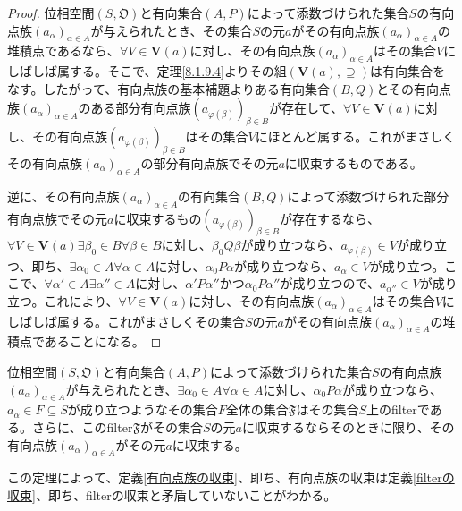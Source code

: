 \documentclass[dvipdfmx]{jsarticle}
\begin{document}
\begin{proof}
位相空間$\left( S,\mathfrak{O} \right)$と有向集合$(A,P)$によって添数づけられた集合$S$の有向点族$\left( a_{\alpha} \right)_{\alpha \in A}$が与えられたとき、その集合$S$の元$a$がその有向点族$\left( a_{\alpha} \right)_{\alpha \in A}$の堆積点であるなら、$\forall V \in \mathbf{V}(a)$に対し、その有向点族$\left( a_{\alpha} \right)_{\alpha \in A}$はその集合$V$にしばしば属する。そこで、定理\ref{8.1.9.4}よりその組$\left( \mathbf{V}(a), \supseteq \right)$は有向集合をなす。したがって、有向点族の基本補題よりある有向集合$(B,Q)$とその有向点族$\left( a_{\alpha} \right)_{\alpha \in A}$のある部分有向点族$\left( a_{\varphi(\beta)} \right)_{\beta \in B}$が存在して、$\forall V \in \mathbf{V}(a)$に対し、その有向点族$\left( a_{\varphi(\beta)} \right)_{\beta \in B}$はその集合$V$にほとんど属する。これがまさしくその有向点族$\left( a_{\alpha} \right)_{\alpha \in A}$の部分有向点族でその元$a$に収束するものである。\par
逆に、その有向点族$\left( a_{\alpha} \right)_{\alpha \in A}$の有向集合$(B,Q)$によって添数づけられた部分有向点族でその元$a$に収束するもの$\left( a_{\varphi(\beta)} \right)_{\beta \in B}$が存在するなら、$\forall V \in \mathbf{V}(a)\exists\beta_{0} \in B\forall\beta \in B$に対し、$\beta_{0}Q\beta$が成り立つなら、$a_{\varphi(\beta)} \in V$が成り立つ、即ち、$\exists\alpha_{0} \in A\forall\alpha \in A$に対し、$\alpha_{0}P\alpha$が成り立つなら、$a_{\alpha} \in V$が成り立つ。ここで、$\forall\alpha' \in A\exists\alpha'' \in A$に対し、$\alpha'P\alpha''$かつ$\alpha_{0}P\alpha''$が成り立つので、$a_{\alpha''} \in V$が成り立つ。これにより、$\forall V \in \mathbf{V}(a)$に対し、その有向点族$\left( a_{\alpha} \right)_{\alpha \in A}$はその集合$V$にしばしば属する。これがまさしくその集合$S$の元$a$がその有向点族$\left( a_{\alpha} \right)_{\alpha \in A}$の堆積点であることになる。
\end{proof}
\begin{thm}\label{8.1.9.6}
位相空間$\left( S,\mathfrak{O} \right)$と有向集合$(A,P)$によって添数づけられた集合$S$の有向点族$\left( a_{\alpha} \right)_{\alpha \in A}$が与えられたとき、$\exists\alpha_{0} \in A\forall\alpha \in A$に対し、$\alpha_{0}P\alpha$が成り立つなら、$a_{\alpha} \in F \subseteq S$が成り立つようなその集合$F$全体の集合$\mathfrak{F}$はその集合$S$上のfilterである。さらに、このfilter$\mathfrak{F}$がその集合$S$の元$a$に収束するならそのときに限り、その有向点族$\left( a_{\alpha} \right)_{\alpha \in A}$がその元$a$に収束する。
\end{thm}\par
この定理によって、定義\ref{有向点族の収束}、即ち、有向点族の収束は定義\ref{filterの収束}、即ち、filterの収束と矛盾していないことがわかる。
\end{document}
